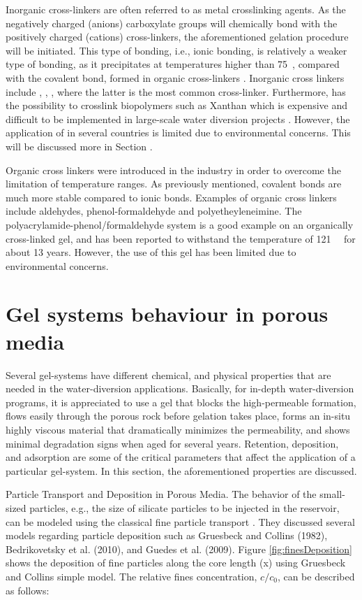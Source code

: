 Inorganic cross-linkers are often referred to as metal crosslinking agents. As the negatively charged (anions) carboxylate groups will chemically bond with the positively charged (cations) cross-linkers, the aforementioned gelation procedure will be initiated. This type of bonding, i.e., ionic bonding, is relatively a weaker type of bonding, as it precipitates at temperatures higher than 75~\celsius, compared with the covalent bond, formed in organic cross-linkers \citep{Al-Muntasheri2005}. Inorganic cross linkers include , , , where the latter is the most common cross-linker. Furthermore,  has the possibility to crosslink biopolymers such as Xanthan which is expensive and difficult to be implemented in large-scale water diversion projects \citep{Al-Muntasheri2012}. However, the application of  in several countries is limited due to environmental concerns. This will be discussed more in Section .

Organic cross linkers were introduced in the industry in order to overcome the limitation of temperature ranges\citep{Al-Muntasheri2005}. As previously mentioned, covalent bonds are much more stable compared to ionic bonds. Examples of organic cross linkers include aldehydes, phenol-formaldehyde and polyetheyleneimine. The polyacrylamide-phenol/formaldehyde system is a good example on an organically cross-linked gel, and has been reported to withstand the temperature of 121~\celsius~ for about 13 years. However, the use of this gel has been limited due to environmental concerns.

\section{Gel systems behaviour in porous media}

Several gel-systems have different chemical, and physical properties that are needed in the water-diversion applications. Basically, for in-depth water-diversion programs, it is appreciated to use a gel that blocks the high-permeable formation, flows easily through the porous rock before gelation takes place, forms an in-situ highly viscous material that dramatically minimizes the permeability, and shows minimal degradation signs when aged for several years. Retention, deposition, and adsorption are some of the critical parameters that affect the application of a particular gel-system. In this section, the aforementioned properties are discussed.

Particle Transport and Deposition in Porous Media. The behavior of the small-sized particles, e.g., the size of silicate particles to be injected in the reservoir, can be modeled using the classical fine particle transport \citep{Stavland2011}. They discussed several models regarding particle deposition such as Gruesbeck and Collins (1982), Bedrikovetsky et al. (2010), and Guedes et al. (2009). Figure \ref{fig:finesDeposition} shows the deposition of fine particles along the core length (x) using Gruesbeck and Collins simple model. The relative fines concentration, $c/c_0$, can be described as follows:

